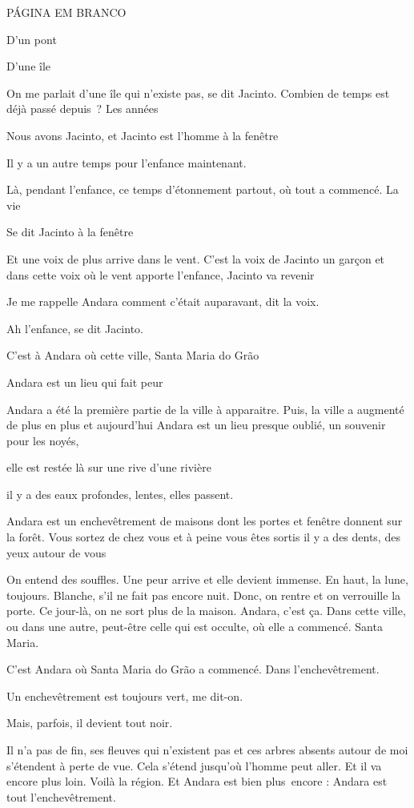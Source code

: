 PÁGINA EM BRANCO

D'un pont

D'une île

On me parlait d'une île qui n'existe pas, se dit Jacinto. Combien de
temps est déjà passé depuis~? Les années

Nous avons Jacinto, et Jacinto est l'homme à la fenêtre

Il y a un autre temps pour l'enfance maintenant.

Là, pendant l'enfance, ce temps d'étonnement partout, où tout a
commencé. La vie

Se dit Jacinto à la fenêtre

Et une voix de plus arrive dans le vent. C'est la voix de Jacinto un
garçon et dans cette voix où le vent apporte l'enfance, Jacinto va
revenir

Je me rappelle Andara comment c'était auparavant, dit la voix.

Ah l'enfance, se dit Jacinto.

C'est à Andara où cette ville, Santa Maria do Grão

Andara est un lieu qui fait peur

Andara a été la première partie de la ville à apparaitre. Puis, la ville
a augmenté de plus en plus et aujourd'hui Andara est un lieu presque
oublié, un souvenir pour les noyés,

elle est restée là sur une rive d'une rivière

il y a des eaux profondes, lentes, elles passent.

Andara est un enchevêtrement de maisons dont les portes et fenêtre
donnent sur la forêt. Vous sortez de chez vous et à peine vous êtes
sortis il y a des dents, des yeux autour de vous

On entend des souffles. Une peur arrive et elle devient immense. En
haut, la lune, toujours. Blanche, s'il ne fait pas encore nuit. Donc, on
rentre et on verrouille la porte. Ce jour-là, on ne sort plus de la
maison. Andara, c'est ça. Dans cette ville, ou dans une autre, peut-être
celle qui est occulte, où elle a commencé. Santa Maria.

C'est Andara où Santa Maria do Grão a commencé. Dans l'enchevêtrement.

Un enchevêtrement est toujours vert, me dit-on.

Mais, parfois, il devient tout noir.

Il n'a pas de fin, ses fleuves qui n'existent pas et ces arbres absents
autour de moi s'étendent à perte de vue. Cela s'étend jusqu'où l'homme
peut aller. Et il va encore plus loin. Voilà la région. Et Andara est
bien plus~encore : Andara est tout l'enchevêtrement.

